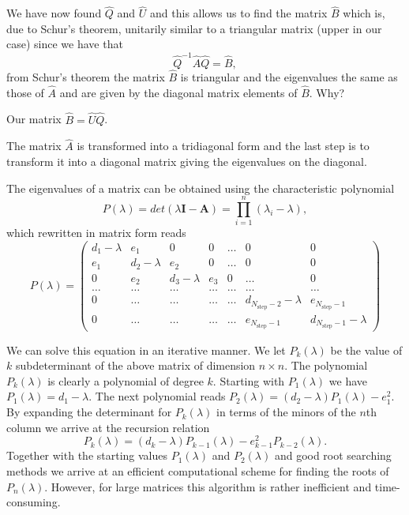 \documentclass[%
oneside,                 %
final,                   %
10pt]{article}
\begin{document}
We have now found $\hat{Q}$ and $\hat{U}$ and this allows us to find the matrix $\hat{B}$
which is, due to Schur's theorem,  unitarily similar to a triangular matrix (upper in our case) 
since we have that 
\[
\hat{Q}^{-1}\hat{A}\hat{Q} = \hat{B}, 
\]
from Schur's theorem the  matrix $\hat{B}$ is triangular and the eigenvalues the same as those of 
$\hat{A}$ and are given by the diagonal matrix elements of 
$\hat{B}$. Why?  

Our matrix $\hat{B}=\hat{U}\hat{Q}$. 

The matrix $\hat{A}$ is transformed into a tridiagonal form and the last
step is to transform it into a diagonal matrix giving the eigenvalues
on the diagonal. 

The eigenvalues of a  matrix can be obtained using the characteristic polynomial 
\[
P(\lambda) = det(\lambda\mathbf{I}-\mathbf{A})= \prod_{i=1}^{n}\left(\lambda_i-\lambda\right),
\]
which rewritten in matrix form reads 
\[
P(\lambda)= \left( \begin{array}{ccccccc} d_1-\lambda & e_1 & 0   & 0    & \dots  &0     & 0 \\
                                e_1 & d_2-\lambda & e_2 & 0    & \dots  &0     &0 \\
                                0   & e_2 & d_3-\lambda & e_3  &0       &\dots & 0\\
                                \dots  & \dots & \dots & \dots  &\dots      &\dots & \dots\\
                                0   & \dots & \dots & \dots  &\dots       &d_{N_{\mathrm{step}}-2}-\lambda & e_{N_{\mathrm{step}}-1}\\
                                0   & \dots & \dots & \dots  &\dots       &e_{N_{\mathrm{step}}-1} & d_{N_{\mathrm{step}}-1}-\lambda
             \end{array} \right)
\] 

We can solve this equation in an iterative manner. 
We let $P_k(\lambda)$ be the value of $k$ subdeterminant of the above matrix of dimension
$n\times n$. The polynomial $P_k(\lambda)$ is clearly a polynomial of degree $k$.
Starting with $P_1(\lambda)$ we have $P_1(\lambda)=d_1-\lambda$. The next polynomial reads
$P_2(\lambda)=(d_2-\lambda)P_1(\lambda)-e_1^2$. By expanding the determinant for $P_k(\lambda)$ 
in terms of the minors of the $n$th column we arrive at the recursion relation
\[ 
   P_k(\lambda)=(d_k-\lambda)P_{k-1}(\lambda)-e_{k-1}^2P_{k-2}(\lambda).
\]
Together with the starting values $P_1(\lambda)$ and $P_2(\lambda)$ and good root searching methods
we arrive at an efficient computational scheme for finding the roots of $P_n(\lambda)$. 
However, for large matrices this algorithm is rather inefficient and time-consuming.
\end{document}
